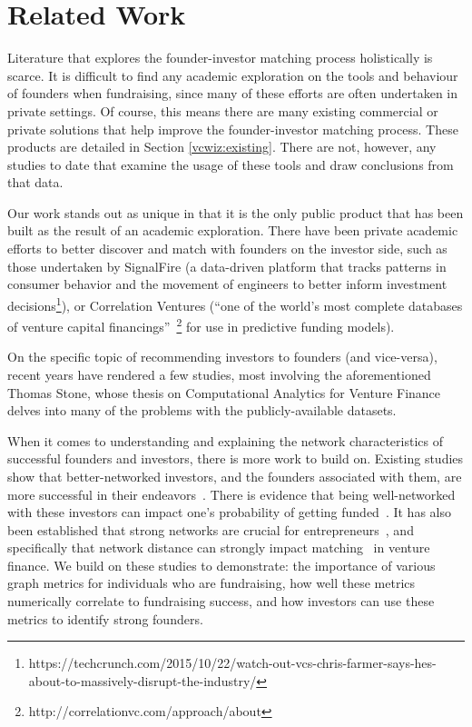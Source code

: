 \section{Related Work}
\label{ch2:related}

Literature that explores the founder-investor matching process holistically is scarce. It is difficult to find any academic exploration on the tools and behaviour of founders when fundraising, since many of these efforts are often undertaken in private settings. Of course, this means there are many existing commercial or private solutions that help improve the founder-investor matching process. These products are detailed in Section \ref{vcwiz:existing}. There are not, however, any studies to date that examine the usage of these tools and draw conclusions from that data.

Our work stands out as unique in that it is the only public product that has been built as the result of an academic exploration. There have been private academic efforts to better discover and match with founders on the investor side, such as those undertaken by SignalFire (a data-driven platform that tracks patterns in consumer behavior and the movement of engineers to better inform investment decisions\footnote{https://techcrunch.com/2015/10/22/watch-out-vcs-chris-farmer-says-hes-about-to-massively-disrupt-the-industry/}), or Correlation Ventures (``one of the world's most complete databases of venture capital financings''~\footnote{http://correlationvc.com/approach/about} for use in predictive funding models).

On the specific topic of recommending investors to founders (and vice-versa), recent years have rendered a few studies, most involving the aforementioned Thomas Stone, whose thesis on Computational Analytics for Venture Finance~\cite{stone2014computational} delves into many of the problems with the publicly-available datasets.

When it comes to understanding and explaining the network characteristics of successful founders and investors, there is more work to build on. Existing studies show that better-networked investors, and the founders associated with them, are more successful in their endeavors~\cite{doi:10.1111/j.1540-6261.2007.01207.x}. There is evidence that being well-networked with these investors can impact one's probability of getting funded~\cite{doi:10.1287/mnsc.48.3.364.7731}. It has also been established that strong networks are crucial for entrepreneurs~\cite{BIRLEY1985107}, and specifically that network distance can strongly impact matching~\cite{pasquini2017matching} in venture finance. We build on these studies to demonstrate: the importance of various graph metrics for individuals who are fundraising, how well these metrics numerically correlate to fundraising success, and how investors can use these metrics to identify strong founders.

